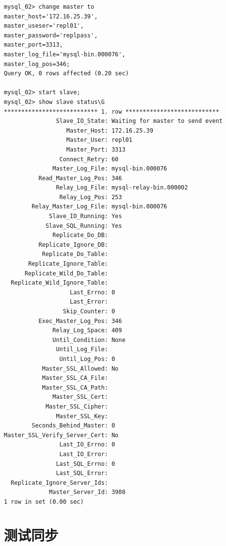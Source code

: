 \begin{verbatim}
mysql_02> change master to 
master_host='172.16.25.39', 
master_useser='repl01', 
master_password='replpass', 
master_port=3313, 
master_log_file='mysql-bin.000076', 
master_log_pos=346;
Query OK, 0 rows affected (0.20 sec)

mysql_02> start slave;
mysql_02> show slave status\G
*************************** 1. row ***************************
               Slave_IO_State: Waiting for master to send event
                  Master_Host: 172.16.25.39
                  Master_User: repl01
                  Master_Port: 3313
                Connect_Retry: 60
              Master_Log_File: mysql-bin.000076
          Read_Master_Log_Pos: 346
               Relay_Log_File: mysql-relay-bin.000002
                Relay_Log_Pos: 253
        Relay_Master_Log_File: mysql-bin.000076
             Slave_IO_Running: Yes
            Slave_SQL_Running: Yes
              Replicate_Do_DB: 
          Replicate_Ignore_DB: 
           Replicate_Do_Table: 
       Replicate_Ignore_Table: 
      Replicate_Wild_Do_Table: 
  Replicate_Wild_Ignore_Table: 
                   Last_Errno: 0
                   Last_Error: 
                 Skip_Counter: 0
          Exec_Master_Log_Pos: 346
              Relay_Log_Space: 409
              Until_Condition: None
               Until_Log_File: 
                Until_Log_Pos: 0
           Master_SSL_Allowed: No
           Master_SSL_CA_File: 
           Master_SSL_CA_Path: 
              Master_SSL_Cert: 
            Master_SSL_Cipher: 
               Master_SSL_Key: 
        Seconds_Behind_Master: 0
Master_SSL_Verify_Server_Cert: No
                Last_IO_Errno: 0
                Last_IO_Error: 
               Last_SQL_Errno: 0
               Last_SQL_Error: 
  Replicate_Ignore_Server_Ids: 
             Master_Server_Id: 3908
1 row in set (0.00 sec)

\end{verbatim}
\section{测试同步}

